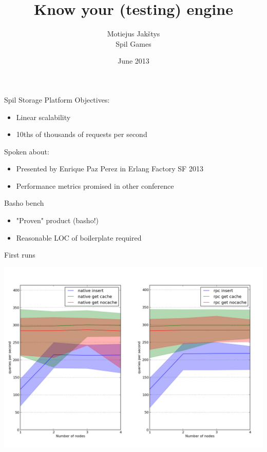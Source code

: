 \documentclass[14pt]{beamer}
\title{Know your (testing) engine}
\author{Motiejus Jak\v{s}tys \\
Spil Games}
\date{June 2013}
\begin{document}
\begin{frame}[plain]
    \titlepage
\end{frame}

\begin{frame}{Spil Storage Platform}
    Objectives:
    \begin{itemize}
        \item Linear scalability
        \item 10ths of thousands of requests per second
    \end{itemize}
    Spoken about:
    \begin{itemize}
        \item Presented by Enrique Paz Perez in Erlang Factory SF 2013
        \item Performance metrics promised in other conference
    \end{itemize}
\end{frame}

\begin{frame}{Basho bench}
    \begin{itemize}
        \item "Proven" product (basho!)
        \item Reasonable LOC of boilerplate required
    \end{itemize}
\end{frame}

\begin{frame}{First runs}
    \begin{center}
        \includegraphics[height=0.8\textheight]{sspbench_both.png}
    \end{center}
\end{frame}
\end{document}
